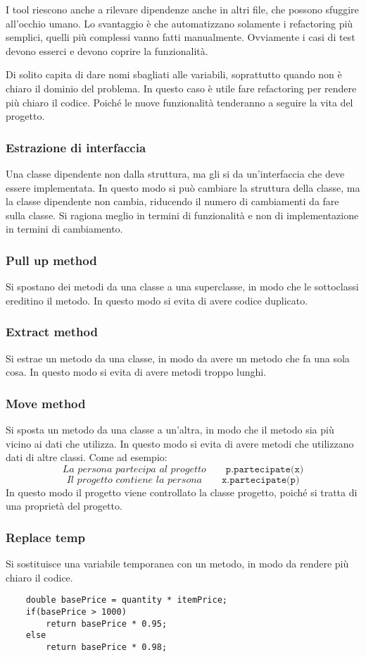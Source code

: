 I tool riescono anche a rilevare dipendenze anche in altri file,
che possono sfuggire all'occhio umano. Lo svantaggio è che automatizzano 
solamente i refactoring più semplici, quelli più complessi vanno fatti
manualmente. Ovviamente i casi di test devono esserci e devono coprire 
la funzionalità.

Di solito capita di dare nomi sbagliati alle variabili, soprattutto 
quando non è chiaro il dominio del problema. In questo caso è utile
fare refactoring per rendere più chiaro il codice. Poiché le nuove funzionalità 
tenderanno a seguire la vita del progetto.
\subsubsection{Estrazione di interfaccia}
Una classe dipendente non dalla struttura, ma gli si da un'interfaccia
che deve essere implementata. In questo modo si può cambiare la struttura
della classe, ma la classe dipendente non cambia, riducendo il numero di 
cambiamenti da fare sulla classe. Si ragiona meglio in termini di funzionalità 
e non di implementazione in termini di cambiamento.
\subsubsection{Pull up method}
Si spostano dei metodi da una classe a una superclasse, in modo che
le sottoclassi ereditino il metodo. In questo modo si evita di avere
codice duplicato. 
\subsubsection{Extract method}
Si estrae un metodo da una classe, in modo da avere un metodo che
fa una sola cosa. In questo modo si evita di avere metodi troppo lunghi.
\subsubsection{Move method}
Si sposta un metodo da una classe a un'altra, in modo che il metodo
sia più vicino ai dati che utilizza. In questo modo si evita di avere
metodi che utilizzano dati di altre classi.
Come ad esempio:
\[
    \textit{La persona partecipa al progetto}\qquad \texttt{p.partecipate(x)}
\]
\[
    \textit{Il progetto contiene la persona} \qquad \texttt{x.partecipate(p)}
\]
In questo modo il progetto viene controllato la classe progetto,
poiché si tratta di una proprietà del progetto.
\subsubsection{Replace temp}
Si sostituisce una variabile temporanea con un metodo, in modo da
rendere più chiaro il codice.
\begin{lstlisting}
    double basePrice = quantity * itemPrice;
    if(basePrice > 1000)
        return basePrice * 0.95;
    else
        return basePrice * 0.98;
\end{lstlisting}

